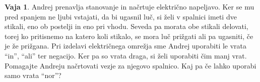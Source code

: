 \documentclass{article}
\theoremstyle{definition}
\newtheorem{vaja}{Vaja}
\begin{document}
\begin{vaja}
Andrej prenavlja stanovanje in načrtuje električno napeljavo. Ker se mu pred spanjem ne ljubi vstajati, da bi ugasnil luč, si želi v spalnici imeti dve stikali, eno ob postelji in eno pri vhodu. Seveda pa morata obe stikali delovati, torej ko pritisnemo na katero koli stikalo, se mora luč prižgati ali pa ugasniti, če je že prižgana. Pri izdelavi električnega omrežja sme Andrej uporabiti le vrata ``in'', ``ali'' ter negacijo. Ker pa so vrata draga, si želi uporabiti čim manj vrat. Pomagajte Andreju načrtovati vezje za njegovo spalnico. Kaj pa če lahko uporabi samo vrata ``nor''?


\end{vaja}
\end{document}
